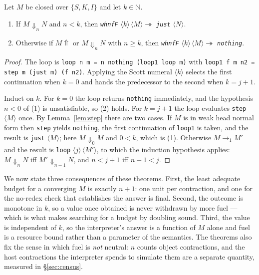\documentclass[review]{jfp-epi}
\newcommand{\NN}{\mathbb{N}}
\begin{document}
\begin{theorem}\label{thm:fuel}
Let $M$ be closed over $\{S,K,I\}$ and let $k \in \NN$.
\begin{enumerate}[nosep]
\item If $M \Downarrow_n N$ and $n < k$, then \emph{\texttt{whnfF}}
  $\langle k\rangle\,\langle M\rangle \twoheadrightarrow$
  \emph{\texttt{just}} $\langle N\rangle$.
\item Otherwise if $M \Uparrow$ or $M \Downarrow_n N$ with $n \ge
  k$, then \emph{\texttt{whnfF}} $\langle k\rangle\,\langle M\rangle
  \twoheadrightarrow$ \emph{\texttt{nothing}}.
\end{enumerate}
\end{theorem}

\begin{proof}
The loop is \texttt{loop n m = n nothing (loop1 loop m)} with
\texttt{loop1 f m n2 = step m (just m) (f n2)}.  Applying the Scott
numeral $\langle k \rangle$ selects the first continuation when $k = 0$
and hands the predecessor to the second when $k = j+1$.

Induct on $k$.  For $k = 0$ the loop returns \texttt{nothing}
immediately, and the hypothesis $n < 0$ of (1) is unsatisfiable, so (2)
holds.  For $k = j+1$ the loop evaluates \texttt{step} $\langle
M\rangle$ once.  By Lemma~\ref{lem:step} there are two cases.  If $M$
is in weak head normal form then \texttt{step} yields \texttt{nothing},
the first continuation of \texttt{loop1} is taken, and the result is
\texttt{just} $\langle M\rangle$; here $M \Downarrow_0 M$ and $0 < k$,
which is (1).  Otherwise $M \to_1 M'$ and the result is \texttt{loop}
$\langle j\rangle\,\langle M'\rangle$, to which the induction
hypothesis applies: $M \Downarrow_n N$ iff $M' \Downarrow_{n-1} N$, and
$n < j+1$ iff $n-1 < j$.
\end{proof}

We now state three consequences of these theorems.
First, the least adequate budget for a converging $M$ is exactly $n+1$:
one unit per contraction, and one for the no-redex check that
establishes the answer is final.  Second, the outcome is monotone in
$k$, so a value once obtained is never withdrawn by more fuel --- which
is what makes searching for a budget by doubling sound.  Third, the
value is independent of $k$, so the interpreter's answer is a function
of $M$ alone and fuel is a resource bound rather than a parameter of the
semantics.  The theorems also fix the sense in which fuel is
\emph{not} neutral: $n$ counts object contractions, and the host
contractions the interpreter spends to simulate them are a separate
quantity, measured in \S\ref{sec:census}.
\end{document}
